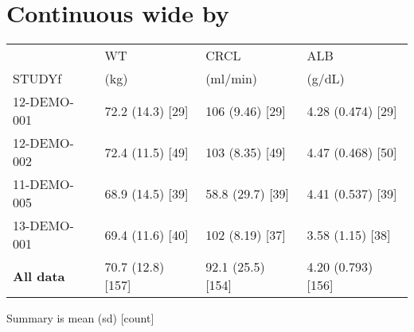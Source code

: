 \documentclass[
]{article}
\newenvironment{Shaded}{\begin{snugshade}}{\end{snugshade}}
\newcommand{\ControlFlowTok}[1]{\textcolor[rgb]{0.13,0.29,0.53}{\textbf{#1}}}
\newcommand{\DataTypeTok}[1]{\textcolor[rgb]{0.13,0.29,0.53}{#1}}
\newcommand{\KeywordTok}[1]{\textcolor[rgb]{0.13,0.29,0.53}{\textbf{#1}}}
\newcommand{\NormalTok}[1]{#1}
\newcommand{\OperatorTok}[1]{\textcolor[rgb]{0.81,0.36,0.00}{\textbf{#1}}}
\newcommand{\StringTok}[1]{\textcolor[rgb]{0.31,0.60,0.02}{#1}}
\begin{document}
\clearpage

\hypertarget{continuous-wide-by}{%
\section{Continuous wide by}\label{continuous-wide-by}}

\begin{Shaded}
\end{Shaded}

\begin{table}[h]
\centering
{\def\arraystretch{1.4}\tabcolsep=5pt
\begin{threeparttable}
\begin{tabular}[h]{llll}
\hline
 & WT & CRCL & ALB \\ [-0.56em]
STUDYf & (kg) & (ml/min) & (g/dL) \\
\hline
12-DEMO-001 & 72.2 (14.3) [29] & 106 (9.46) [29] & 4.28 (0.474) [29] \\
12-DEMO-002 & 72.4 (11.5) [49] & 103 (8.35) [49] & 4.47 (0.468) [50] \\
11-DEMO-005 & 68.9 (14.5) [39] & 58.8 (29.7) [39] & 4.41 (0.537) [39] \\
13-DEMO-001 & 69.4 (11.6) [40] & 102 (8.19) [37] & 3.58 (1.15) [38] \\
\hline \hline {\bf All data} & 70.7 (12.8) [157] & 92.1 (25.5) [154] & 4.20 (0.793) [156] \\
\hline
\end{tabular}
\begin{tablenotes}[flushleft]
\item Summary is mean (sd) [count]
\end{tablenotes}
\end{threeparttable}
}
\end{table}

\begin{Shaded}
\end{Shaded}
\end{document}

